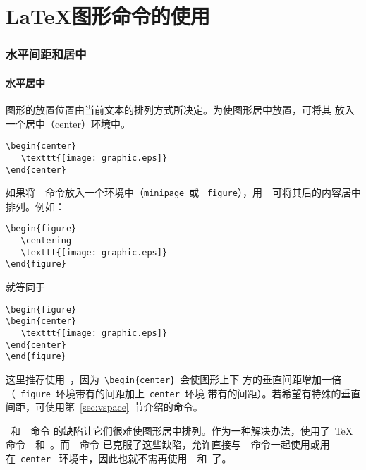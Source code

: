 
\part{\LaTeX{}图形命令的使用}

\section{水平间距和居中}\label{sec:center}

\subsection{水平居中}\label{ssec:hcenter}

图形的放置位置由当前文本的排列方式所决定。为使图形居中放置，可将其
放入一个居中（center）环境中。

\begin{Verbatim}[xleftmargin=1cm]
\begin{center}
   \texttt{[image: graphic.eps]}
\end{center}
\end{Verbatim}

如果将~~命令放入一个环境中（\texttt{minipage}~或
~\texttt{figure}），用~~可将其后的内容居中排列。例如：

\begin{Verbatim}[xleftmargin=1cm]
\begin{figure}
   \centering
   \texttt{[image: graphic.eps]}
\end{figure}
\end{Verbatim}
就等同于
\begin{Verbatim}[xleftmargin=1cm]
\begin{figure}
\begin{center}
   \texttt{[image: graphic.eps]}
\end{center}
\end{figure}
\end{Verbatim}

这里推荐使用~，因为~\verb+\begin{center}+~会使图形上下
方的垂直间距增加一倍（~\texttt{figure}~环境带有的间距加上~\texttt{center}~环境
带有的间距）。若希望有特殊的垂直间距，可使用第~\ref{sec:vspace}~节介绍的命令。

~和~~命令
的缺陷让它们很难使图形居中排列。作为一种解决办法，使用了~\TeX{}~
命令~~和~。而~~命令
已克服了这些缺陷，允许直接与~~命令一起使用或用在~\texttt{center}
~环境中，因此也就不需再使用~~和~了。

